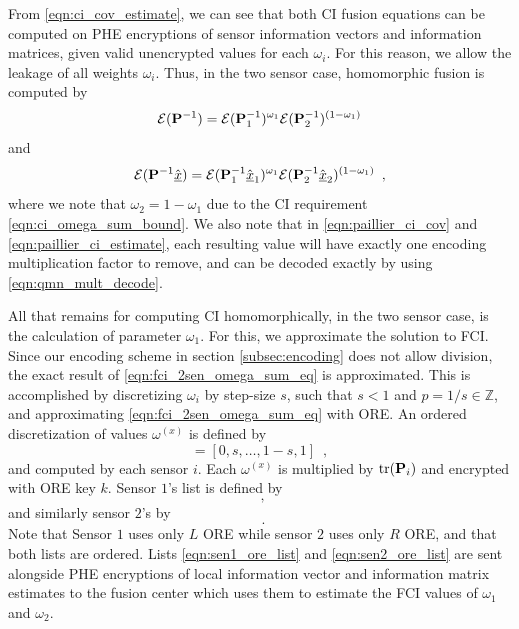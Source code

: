\documentclass[letterpaper, 10 pt, journal, twoside]{ieeetran}  %
\begin{document}
From \eqref{eqn:ci_cov_estimate}, we can see that both CI fusion equations can be computed on PHE encryptions of sensor information vectors and information matrices, given valid unencrypted values for each $\omega_i$. For this reason, we allow the leakage of all weights $\omega_i$. Thus, in the two sensor case, homomorphic fusion is computed by
\begin{equation}
   \mathcal{E}({{\mathbf{P}}}^{-1}) = \mathcal{E}({{\mathbf{P}}}^{-1}_1)^{\omega_1}\mathcal{E}({{\mathbf{P}}}^{-1}_2)^{(1 -\omega_1)} \label{eqn:paillier_ci_cov}
\end{equation}
and
\begin{equation}
   \mathcal{E}({{\mathbf{P}}}^{-1}\hat{{\underline{x}}}) = \mathcal{E}({{\mathbf{P}}}^{-1}_1\hat{{\underline{x}}}_1)^{\omega_1}\mathcal{E}({{\mathbf{P}}}^{-1}_2\hat{{\underline{x}}}_2)^{(1 - \omega_1)}\enspace, \label{eqn:paillier_ci_estimate}
\end{equation}
where we note that $\omega_2=1-\omega_1$ due to the CI requirement \eqref{eqn:ci_omega_sum_bound}. We also note that in \eqref{eqn:paillier_ci_cov} and \eqref{eqn:paillier_ci_estimate}, each resulting value will have exactly one encoding multiplication factor to remove, and can be decoded exactly by using \eqref{eqn:qmn_mult_decode}.
   
All that remains for computing CI homomorphically, in the two sensor case, is the calculation of parameter $\omega_1$. For this, we approximate the solution to FCI. Since our encoding scheme in section \ref{subsec:encoding} does not allow division, the exact result of \eqref{eqn:fci_2sen_omega_sum_eq} is approximated. This is accomplished by discretizing $\omega_i$ by step-size $s$, such that $s<1$ and $p=1/s \in \mathbb{Z}$, and approximating \eqref{eqn:fci_2sen_omega_sum_eq} with ORE. An ordered discretization of values $\omega^{(x)}$ is defined by
\begin{equation}
   [\omega^{(1)},\dots,\omega^{(p)}] = [0,s,\dots,1-s,1]\enspace,
\end{equation}
and computed by each sensor $i$. Each $\omega^{(x)}$ is multiplied by $\operatorname{tr}({{\mathbf{P}}}_i)$ and encrypted with ORE key $k$. Sensor $1$'s list is defined by 
\begin{equation}
   [\mathcal{E}^L_{ORE}(\omega^{(1)}\tr(\mP_1)),\dots,\mathcal{E}^L_{ORE}(\omega^{(p)}\tr(\mP_1))]\enspace, \label{eqn:sen1_ore_list}
\end{equation}
and similarly sensor $2$'s by
\begin{equation}
   [\mathcal{E}^R_{ORE}(\omega^{(1)}\tr(\mP_2)),\dots,\mathcal{E}^R_{ORE}(\omega^{(p)}\tr(\mP_2))]\enspace. \label{eqn:sen2_ore_list}
\end{equation}
Note that Sensor $1$ uses only $L$ ORE while sensor $2$ uses only $R$ ORE, and that both lists are ordered. Lists \eqref{eqn:sen1_ore_list} and \eqref{eqn:sen2_ore_list} are sent alongside PHE encryptions of local information vector and information matrix estimates to the fusion center which uses them to estimate the FCI values of $\omega_1$ and $\omega_2$.
\end{document}

